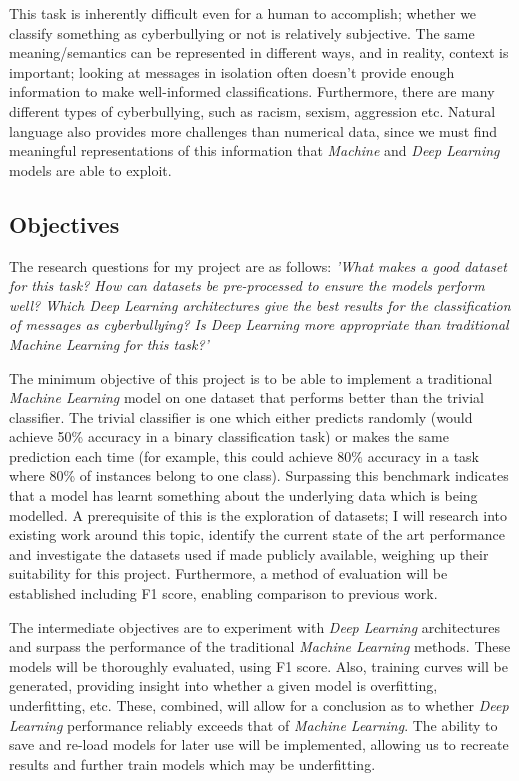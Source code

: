 \documentclass[12pt,a4paper]{article}
\begin{document}
This task is inherently difficult even for a human to accomplish; whether we classify something as cyberbullying or not is relatively subjective. The same meaning/semantics can be represented in different ways, and in reality, context is important; looking at messages in isolation often doesn't provide enough information to make well-informed classifications. Furthermore, there are many different types of cyberbullying, such as racism, sexism, aggression etc. Natural language also provides more challenges than numerical data, since we must find meaningful representations of this information that \textit{Machine} and \textit{Deep Learning} models are able to exploit.



\subsection{Objectives}
The research questions for my project are as follows: \newline
\textit{'What makes a good dataset for this task? How can datasets be pre-processed to ensure the models perform well? Which Deep Learning architectures give the best results for the classification of messages as cyberbullying? Is Deep Learning more appropriate than traditional Machine Learning for this task?'} \newline

The minimum objective of this project is to be able to implement a traditional \textit{Machine Learning} model on one dataset that performs better than the trivial classifier. The trivial classifier is one which either predicts randomly (would achieve 50\% accuracy in a binary classification task) or makes the same prediction each time (for example, this could achieve 80\% accuracy in a task where 80\% of instances belong to one class). Surpassing this benchmark indicates that a model has learnt something about the underlying data which is being modelled. A prerequisite of this is the exploration of datasets; I will research into existing work around this topic, identify the current state of the art performance and investigate the datasets used if made publicly available, weighing up their suitability for this project. Furthermore, a method of evaluation will be established  including F1 score, enabling comparison to previous work.

The intermediate objectives are to experiment with \textit{Deep Learning} architectures and surpass the performance of the traditional \textit{Machine Learning} methods. These models will be thoroughly evaluated, using F1 score. Also, training curves will be generated, providing insight into whether a given model is overfitting, underfitting, etc. These, combined, will allow for a conclusion as to whether \textit{Deep Learning} performance reliably exceeds that of \textit{Machine Learning}. The ability to save and re-load models for later use will be implemented, allowing us to recreate results and further train models which may be underfitting.
\end{document}
